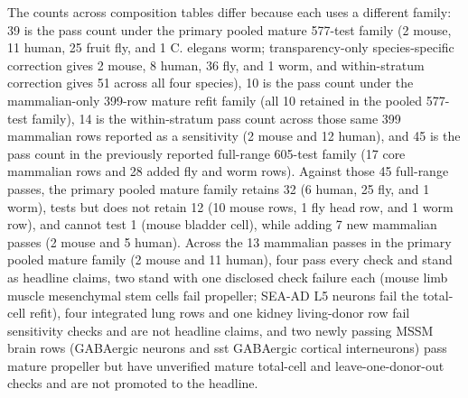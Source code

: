 \documentclass[11pt]{article}
\begin{document}
The counts across composition tables differ because each uses a different family: 39 is the pass count under the primary pooled mature 577-test family (2 mouse, 11 human, 25 fruit fly, and 1 C. elegans worm; transparency-only species-specific correction gives 2 mouse, 8 human, 36 fly, and 1 worm, and within-stratum correction gives 51 across all four species), 10 is the pass count under the mammalian-only 399-row mature refit family (all 10 retained in the pooled 577-test family), 14 is the within-stratum pass count across those same 399 mammalian rows reported as a sensitivity (2 mouse and 12 human), and 45 is the pass count in the previously reported full-range 605-test family (17 core mammalian rows and 28 added fly and worm rows). Against those 45 full-range passes, the primary pooled mature family retains 32 (6 human, 25 fly, and 1 worm), tests but does not retain 12 (10 mouse rows, 1 fly head row, and 1 worm row), and cannot test 1 (mouse bladder cell), while adding 7 new mammalian passes (2 mouse and 5 human). Across the 13 mammalian passes in the primary pooled mature family (2 mouse and 11 human), four pass every check and stand as headline claims, two stand with one disclosed check failure each (mouse limb muscle mesenchymal stem cells fail propeller; SEA-AD L5 neurons fail the total-cell refit), four integrated lung rows and one kidney living-donor row fail sensitivity checks and are not headline claims, and two newly passing MSSM brain rows (GABAergic neurons and sst GABAergic cortical interneurons) pass mature propeller but have unverified mature total-cell and leave-one-donor-out checks and are not promoted to the headline.
\end{document}
